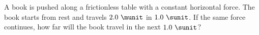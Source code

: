 A book is pushed along a frictionless table with a constant
horizontal force. The book starts from rest and travels $2.0\ \munit$
in $1.0\ \sunit$. If the same force continues, how far will the book
travel in the next $1.0\ \sunit$?
